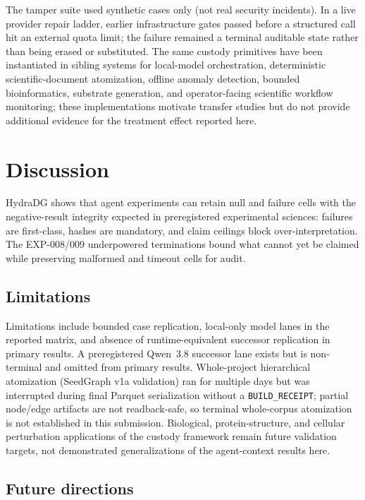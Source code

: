 \documentclass{article}
\begin{document}
The tamper suite used synthetic cases only (not real security incidents).
In a live provider repair ladder, earlier infrastructure gates passed before a structured call hit an external quota limit; the failure remained a terminal auditable state rather than being erased or substituted.
The same custody primitives have been instantiated in sibling systems for local-model orchestration, deterministic scientific-document atomization, offline anomaly detection, bounded bioinformatics, substrate generation, and operator-facing scientific workflow monitoring; these implementations motivate transfer studies but do not provide additional evidence for the treatment effect reported here.

\section{Discussion}

HydraDG shows that agent experiments can retain null and failure cells with the negative-result integrity expected in preregistered experimental sciences: failures are first-class, hashes are mandatory, and claim ceilings block over-interpretation.
The EXP-008/009 underpowered terminations bound what cannot yet be claimed while preserving malformed and timeout cells for audit.

\subsection{Limitations}

Limitations include bounded case replication, local-only model lanes in the reported matrix, and absence of runtime-equivalent successor replication in primary results.
A preregistered Qwen~3.8 successor lane exists but is non-terminal and omitted from primary results.
Whole-project hierarchical atomization (SeedGraph v1a validation) ran for multiple days but was interrupted during final Parquet serialization without a \texttt{BUILD\_RECEIPT}; partial node/edge artifacts are not readback-safe, so terminal whole-corpus atomization is not established in this submission.
Biological, protein-structure, and cellular perturbation applications of the custody framework remain future validation targets, not demonstrated generalizations of the agent-context results here.

\subsection{Future directions}
\end{document}
